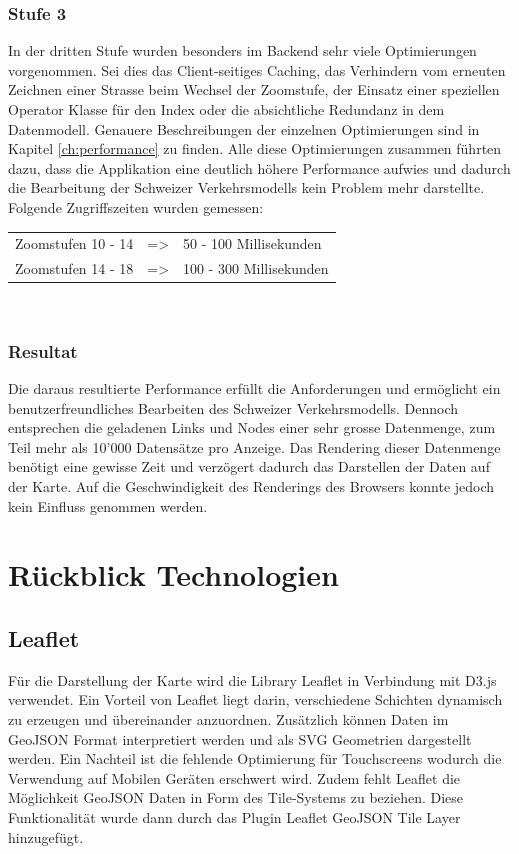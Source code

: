 \subsubsection*{Stufe 3}
In der dritten Stufe wurden besonders im Backend sehr viele Optimierungen vorgenommen. Sei dies das Client-seitiges Caching, das Verhindern vom erneuten Zeichnen einer Strasse beim Wechsel der Zoomstufe, der Einsatz einer speziellen Operator Klasse für den Index oder die absichtliche Redundanz in dem Datenmodell. Genauere Beschreibungen der einzelnen Optimierungen sind in Kapitel \ref{ch:performance}  zu finden. Alle diese Optimierungen zusammen führten dazu, dass die Applikation eine deutlich höhere Performance aufwies und dadurch die Bearbeitung der Schweizer Verkehrsmodells kein Problem mehr darstellte.\\
Folgende Zugriffszeiten wurden gemessen:\\[0.3cm]
\begin{tabular}{ l c l}
Zoomstufen 10 - 14 & => & 50 - 100 Millisekunden \\
Zoomstufen 14 - 18 & => & 100 - 300 Millisekunden \\ 
\end{tabular}\\
\subsubsection*{Resultat}
Die daraus resultierte Performance erfüllt die Anforderungen und ermöglicht ein benutzerfreundliches Bearbeiten des Schweizer Verkehrsmodells. Dennoch entsprechen die geladenen Links und Nodes einer sehr grosse Datenmenge, zum Teil mehr als 10'000 Datensätze pro Anzeige. Das Rendering dieser Datenmenge benötigt eine gewisse Zeit und verzögert dadurch das Darstellen der Daten auf der Karte. Auf die Geschwindigkeit des Renderings des Browsers konnte jedoch kein Einfluss genommen werden.
\newpage
\section{Rückblick Technologien}
\subsection*{Leaflet}
Für die Darstellung der Karte wird die Library Leaflet in Verbindung mit D3.js verwendet. Ein Vorteil von Leaflet liegt darin, verschiedene Schichten dynamisch zu erzeugen und übereinander anzuordnen. Zusätzlich können Daten im GeoJSON Format interpretiert werden und als SVG Geometrien dargestellt werden. Ein Nachteil ist die fehlende Optimierung für Touchscreens wodurch die Verwendung auf Mobilen Geräten erschwert wird. Zudem fehlt Leaflet die Möglichkeit GeoJSON Daten in Form des Tile-Systems zu beziehen. Diese Funktionalität wurde dann durch das Plugin Leaflet GeoJSON Tile Layer hinzugefügt.

